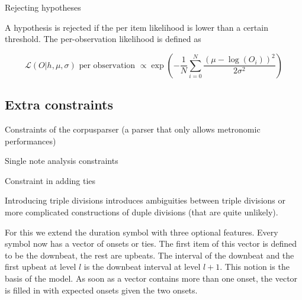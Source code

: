Rejecting hypotheses

A hypothesis is rejected if the per item likelihood is lower than a certain threshold. The per-observation likelihood is defined as

\begin{equation}
\label{eq:per_obs_likelihood}
\mathcal{L}(O|h, \mu, \sigma) \mbox{ per observation } \propto \exp\left(-\frac{1}{N}\sum_{i=0}^N \frac{(\mu - \log(O_i))^2}{2\sigma^2}\right)
\end{equation}

\subsection{Extra constraints}

Constraints of the corpusparser (a parser that only allows metronomic performances)

Single note analysis constraints

Constraint in adding ties


Introducing triple divisions introduces ambiguities between triple divisions or more complicated constructions of duple divisions (that are quite unlikely).

For this we extend the duration symbol with three optional features. Every symbol now has a vector of onsets or ties. The first item of this vector is defined to be the downbeat, the rest are upbeats. The interval of the downbeat and the first upbeat at level $l$ is the downbeat interval at level $l+1$. This notion is the basis of the model. As soon as a vector contains more than one onset, the vector is filled in with expected onsets given the two onsets.





